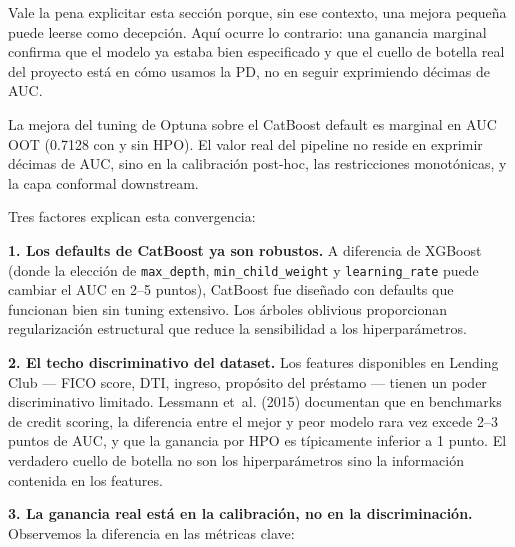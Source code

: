 \documentclass[
  spanish,
  11pt,
  letterpaper,
]{scrbook}
\theoremstyle{plain}
\theoremstyle{remark}
\begin{document}
Vale la pena explicitar esta sección porque, sin ese contexto, una
mejora pequeña puede leerse como decepción. Aquí ocurre lo contrario:
una ganancia marginal confirma que el modelo ya estaba bien especificado
y que el cuello de botella real del proyecto está en cómo usamos la PD,
no en seguir exprimiendo décimas de AUC.

\begin{tcolorbox}[enhanced jigsaw, arc=.35mm, bottomrule=.15mm, bottomtitle=1mm, breakable, colback=white, colbacktitle=quarto-callout-warning-color!10!white, colframe=quarto-callout-warning-color-frame, coltitle=black, left=2mm, leftrule=.75mm, opacityback=0, opacitybacktitle=0.6, rightrule=.15mm, title=\textcolor{quarto-callout-warning-color}{\faExclamationTriangle}\hspace{0.5em}{Ganancia marginal del HPO}, titlerule=0mm, toprule=.15mm, toptitle=1mm]

La mejora del tuning de Optuna sobre el CatBoost default es marginal en
AUC OOT (0.7128 con y sin HPO). El valor real del pipeline no reside en
exprimir décimas de AUC, sino en la calibración post-hoc, las
restricciones monotónicas, y la capa conformal downstream.

\end{tcolorbox}

Tres factores explican esta convergencia:

\textbf{1. Los defaults de CatBoost ya son robustos.} A diferencia de
XGBoost (donde la elección de \texttt{max\_depth},
\texttt{min\_child\_weight} y \texttt{learning\_rate} puede cambiar el
AUC en 2--5 puntos), CatBoost fue diseñado con defaults que funcionan
bien sin tuning extensivo. Los árboles oblivious proporcionan
regularización estructural que reduce la sensibilidad a los
hiperparámetros.

\textbf{2. El techo discriminativo del dataset.} Los features
disponibles en Lending Club --- FICO score, DTI, ingreso, propósito del
préstamo --- tienen un poder discriminativo limitado. {Lessmann et~al.}
(2015) documentan que en benchmarks de credit scoring, la diferencia
entre el mejor y peor modelo rara vez excede 2--3 puntos de AUC, y que
la ganancia por HPO es típicamente inferior a 1 punto. El verdadero
cuello de botella no son los hiperparámetros sino la información
contenida en los features.

\textbf{3. La ganancia real está en la calibración, no en la
discriminación.} Observemos la diferencia en las métricas clave:
\end{document}

